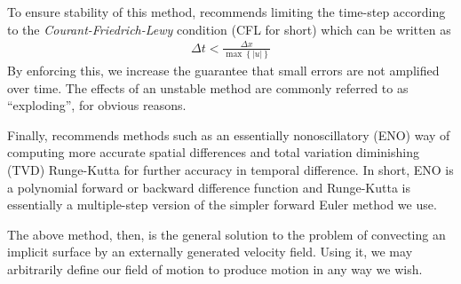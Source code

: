 To ensure stability of this method,  recommends
limiting the time-step according to the \emph{Courant-Friedrich-Lewy}
condition (CFL for short) which can be written as
\begin{align}
  \Delta t < \frac{\Delta x}{\max \left\lbrace \left| u \right| \right\rbrace}
\end{align}
By enforcing this, we increase the guarantee that small errors are not
amplified over time. The effects of an unstable method are commonly
referred to as ``exploding'', for obvious reasons.

Finally,  recommends methods such as an
essentially nonoscillatory (ENO) way of computing more accurate
spatial differences and total variation diminishing (TVD) Runge-Kutta
for further accuracy in temporal difference. In short, ENO is a
polynomial forward or backward difference function and Runge-Kutta is
essentially a multiple-step version of the simpler forward Euler
method we use.

The above method, then, is the general solution to the problem of
convecting an implicit surface by an externally generated velocity
field. Using it, we may arbitrarily define our field of motion to
produce motion in any way we wish.


